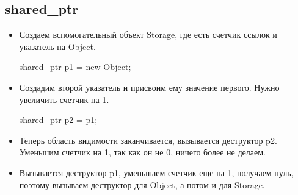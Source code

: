 \subsection{shared\_ptr}
\begin{itemize}[noitemsep]
    \item Создаем вспомогательный объект Storage, где есть счетчик ссылок и указатель на Object.
\begin{ccode}
shared_ptr p1 = new Object;
\end{ccode}
\item Создадим второй указатель и присвоим ему значение первого. Нужно увеличить счетчик на 1.
\begin{ccode}
shared_ptr p2 = p1;
\end{ccode}
\item Теперь область видимости заканчивается, вызывается деструктор p2. Уменьшим счетчик на 1, так как он не 0, ничего более не делаем.
\item Вызывается деструктор p1, уменьшаем счетчик еще на 1, получаем нуль, поэтому вызываем деструктор для Object, а потом и для Storage.
\end{itemize}
